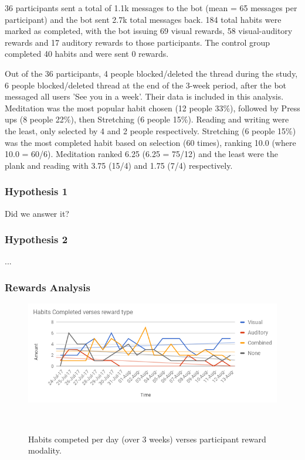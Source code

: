 \documentclass{scaffold/sigchi}
\begin{document}
36 participants sent a total of 1.1k messages to the bot (mean = 65 messages per participant) and the bot sent 2.7k total messages back. 184 total habits were marked as completed, with the bot issuing 69 visual rewards, 58 visual-auditory rewards and 17 auditory rewards to those participants. The control group completed 40 habits and were sent 0 rewards.

Out of the 36 participants, 4 people blocked/deleted the thread during the study, 6 people blocked/deleted thread at the end of the 3-week period, after the bot messaged all users 'See you in a week'. Their data is included in this analysis. Meditation was the most popular habit chosen (12 people 33\%), followed by Press ups (8 people 22\%), then Stretching (6 people 15\%). Reading and writing were the least, only selected by 4 and 2 people respectively. Stretching (6 people 15\%) was the most completed habit based on selection (60 times), ranking 10.0 (where 10.0 = 60/6). Meditation ranked 6.25 (6.25 = 75/12) and the least were the plank and reading with 3.75 (15/4) and 1.75 (7/4) respectively.

\subsubsection{Hypothesis 1}

Did we answer it?

\subsubsection{Hypothesis 2}

...

\subsubsection{Rewards Analysis}

\begin{figure}
  \centering
  \includegraphics[width=1\columnwidth]{figures/habitscompleted-v-rewards.png}
  \caption{Habits competed per day (over 3 weeks) verses participant reward modality.}~\label{fig:habits_v_rewards}
\end{figure}
\end{document}

